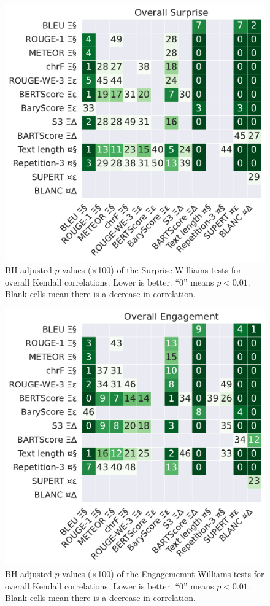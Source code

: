 \begin{figure}[h]
    \centering
    \includegraphics[width=0.62\columnwidth]{pictures/williams_overall_kendall_Surprise.pdf}
    \caption{BH-adjusted $p$-values ($\times$100) of the Surprise Williams tests for overall Kendall correlations. Lower is better. ``0'' means $p<0.01$. Blank cells mean there is a decrease in correlation.}
    \label{fig:williams_overall_surprise}
\end{figure}

\begin{figure}[h]
    \centering
    \includegraphics[width=0.62\columnwidth]{pictures/williams_overall_kendall_Engagement.pdf}
    \caption{BH-adjusted $p$-values ($\times$100) of the Engagememnt Williams tests for overall Kendall correlations. Lower is better. ``0'' means $p<0.01$. Blank cells mean there is a decrease in correlation.}
    \label{fig:williams_overall_engagement}
\end{figure}

